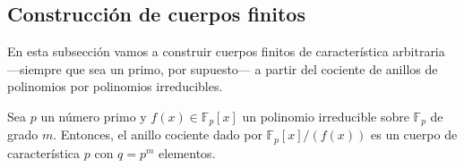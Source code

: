 \subsection{Construcción de cuerpos finitos}

En esta subsección vamos a construir cuerpos finitos de característica arbitraria —siempre que sea un primo, por supuesto— a partir del cociente de anillos de polinomios por polinomios irreducibles.

\begin{proposition}
  Sea \(p\) un número primo y \(f(x) \in \mathbb F_p[x]\) un polinomio irreducible sobre \(\mathbb F_p\) de grado \(m\).
  Entonces, el anillo cociente dado por \(\mathbb F_p[x]/(f(x))\)  es un cuerpo de característica \(p\) con \(q = p^m\) elementos.
\end{proposition}


